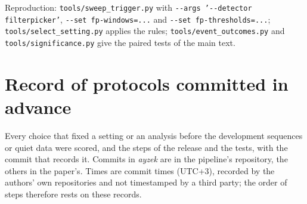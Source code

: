 \documentclass[11pt,a4paper]{article}
\newcommand{\tool}[1]{\nolinkurl{#1}}
\begin{document}
\noindent Reproduction: \tool{tools/sweep_trigger.py} with
\texttt{-{}-args '-{}-detector filterpicker'}, \texttt{-{}-set fp-windows=...} and
\texttt{-{}-set fp-thresholds=...};
\tool{tools/select_setting.py} applies the rules; \tool{tools/event_outcomes.py}
and \tool{tools/significance.py} give the paired tests of the main text.

\clearpage
\section{Record of protocols committed in advance}\label{s:prereg}

Every choice that fixed a setting or an analysis before the development sequences or
quiet data were scored, and the steps of the release and the tests, with the commit
that records it. Commits in \emph{ayzek} are in the
pipeline's repository, the others in the paper's. Times are commit times
(UTC+3), recorded by the authors' own repositories and not timestamped by a third
party; the order of steps therefore rests on these records.
\end{document}
